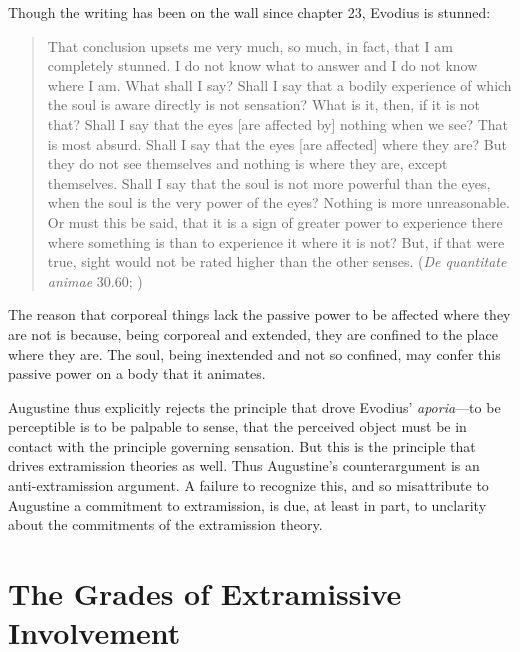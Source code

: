 \documentclass[12pt]{article}
\begin{document}
Though the writing has been on the wall since chapter 23, Evodius is stunned:
\begin{quote}
	That conclusion upsets me very much, so much, in fact, that I am completely stunned. I do not know what to answer and I do not know where I am. What shall I say? Shall I say that a bodily experience of which the soul is aware directly is not sensation? What is it, then, if it is not that? Shall I say that the eyes [are affected by] nothing when we see? That is most absurd. Shall I say that the eyes [are affected] where they are? But they do not see themselves and nothing is where they are, except themselves. Shall I say that the soul is not more powerful than the eyes, when the soul is the very power of the eyes? Nothing is more unreasonable. Or must this be said, that it is a sign of greater power to experience there where something is than to experience it where it is not? But, if that were true, sight would not be rated higher than the other senses. (\emph{De quantitate animae} 30.60; \citealt[87]{Colleran:1949ys})
\end{quote}
The reason that corporeal things lack the passive power to be affected where they are not is because, being corporeal and extended, they are confined to the place where they are. The soul, being inextended and not so confined, may confer this passive power on a body that it animates.

Augustine thus explicitly rejects the principle that drove Evodius' \emph{aporia}---to be perceptible is to be palpable to sense, that the perceived object must be in contact with the principle governing sensation. But this is the principle that drives extramission theories as well. Thus Augustine's counterargument is an anti-extramis\-sion argument. A failure to recognize this, and so misattribute to Augustine a commitment to extramission, is due, at least in part, to unclarity about the commitments of the extramission theory.


\section{The Grades of Extramissive Involvement} %
\label{sec:extramission}
\end{document}
